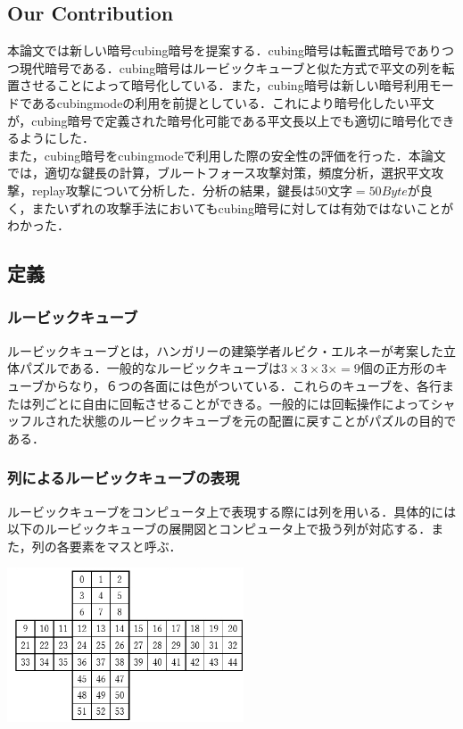 \documentclass[a4p]{jarticle}
\begin{document}
\subsection{Our Contribution}
本論文では新しい暗号cubing暗号を提案する．cubing暗号は転置式暗号でありつつ現代暗号である．cubing暗号はルービックキューブと似た方式で平文の列を転置させることによって暗号化している．また，cubing暗号は新しい暗号利用モードであるcubingmodeの利用を前提としている．これにより暗号化したい平文が，cubing暗号で定義された暗号化可能である平文長以上でも適切に暗号化できるようにした．\\
また，cubing暗号をcubingmodeで利用した際の安全性の評価を行った．本論文では，適切な鍵長の計算，ブルートフォース攻撃対策，頻度分析，選択平文攻撃，replay攻撃について分析した．分析の結果，鍵長は50文字\(=50Byte\)が良く，またいずれの攻撃手法においてもcubing暗号に対しては有効ではないことがわかった．

\subsection{定義}
\subsubsection{ルービックキューブ}
ルービックキューブとは，ハンガリーの建築学者ルビク・エルネーが考案した立体パズルである．一般的なルービックキューブは\(3\times3\times3\times=9\)個の正方形のキューブからなり，６つの各面には色がついている．これらのキューブを、各行または列ごとに自由に回転させることができる。一般的には回転操作によってシャッフルされた状態のルービックキューブを元の配置に戻すことがパズルの目的である．

\subsubsection{列によるルービックキューブの表現}
ルービックキューブをコンピュータ上で表現する際には列を用いる．具体的には以下のルービックキューブの展開図とコンピュータ上で扱う列が対応する．また，列の各要素をマスと呼ぶ．\\
\begin{center}
  \includegraphics[width=7cm]{./tex_pic/seq.jpg}\\
\end{center}
\end{document}
